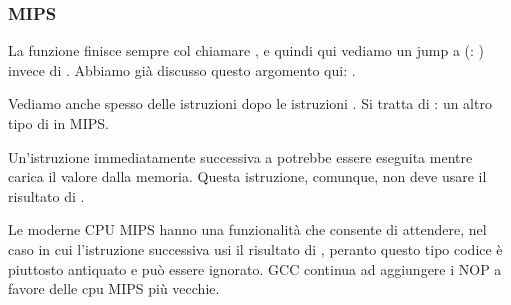 \subsubsection{MIPS}




La funzione finisce sempre col chiamare \puts, e quindi qui vediamo un jump a \puts (: ) invece di .
Abbiamo già discusso questo argomento qui: .

Vediamo anche spesso delle istruzioni  dopo le istruzioni .
Si tratta di : un altro tipo di  in MIPS.

Un'istruzione immediatamente successiva a  potrebbe essere eseguita mentre  carica il valore dalla memoria.
Questa istruzione, comunque, non deve usare il risultato di .

Le moderne CPU MIPS hanno una funzionalità che consente di attendere, nel caso in cui l'istruzione successiva usi il risultato di 
, peranto questo tipo codice è piuttosto antiquato e può essere ignorato. GCC continua ad aggiungere i NOP a favore delle cpu MIPS più vecchie.

